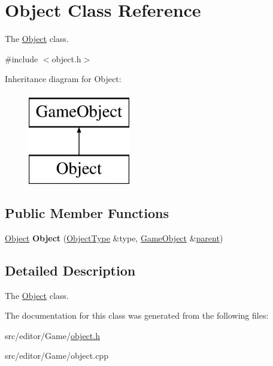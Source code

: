 \hypertarget{class_object}{\section{\-Object \-Class \-Reference}
\label{class_object}
}


\-The \hyperlink{class_object}{\-Object} class.  




{\ttfamily \#include $<$object.\-h$>$}

\-Inheritance diagram for \-Object\-:\begin{figure}[H]
\begin{center}
\leavevmode
\includegraphics[height=4.000000cm]{class_object}
\end{center}
\end{figure}
\subsection*{\-Public \-Member \-Functions}
\begin{DoxyCompactItemize}
\item 
\hypertarget{class_object_ac0b6088495eae65bc1fd37c13423806a}{\hyperlink{class_object}{\-Object} {\bfseries \-Object} (\hyperlink{class_object_type}{\-Object\-Type} \&type, \hyperlink{class_game_object}{\-Game\-Object} \&\hyperlink{class_game_object_af3deaf39cde23c189765634e32e95bb4}{parent})}\label{class_object_ac0b6088495eae65bc1fd37c13423806a}

\end{DoxyCompactItemize}


\subsection{\-Detailed \-Description}
\-The \hyperlink{class_object}{\-Object} class. 

\-The documentation for this class was generated from the following files\-:\begin{DoxyCompactItemize}
\item 
src/editor/\-Game/\hyperlink{object_8h}{object.\-h}\item 
src/editor/\-Game/object.\-cpp\end{DoxyCompactItemize}
